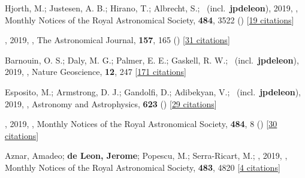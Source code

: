 \item[{\color{numcolor}\scriptsize99}] Hjorth, M.; Justesen, A. B.; Hirano, T.; Albrecht, S.; \etal\ (incl.\ \textbf{jpdeleon}), 2019, , Monthly Notices of the Royal Astronomical Society, \textbf{484}, 3522 () [\href{https://ui.adsabs.harvard.edu/abs/2019MNRAS.484.3522H}{19 citations}]

\item[{\color{numcolor}\scriptsize98}] , 2019, , The Astronomical Journal, \textbf{157}, 165 () [\href{https://ui.adsabs.harvard.edu/abs/2019AJ....157..165A}{31 citations}]

\item[{\color{numcolor}\scriptsize97}] Barnouin, O. S.; Daly, M. G.; Palmer, E. E.; Gaskell, R. W.; \etal\ (incl.\ \textbf{jpdeleon}), 2019, , Nature Geoscience, \textbf{12}, 247 [\href{https://ui.adsabs.harvard.edu/abs/2019NatGe..12..247B}{171 citations}]

\item[{\color{numcolor}\scriptsize96}] Esposito, M.; Armstrong, D. J.; Gandolfi, D.; Adibekyan, V.; \etal\ (incl.\ \textbf{jpdeleon}), 2019, , Astronomy and Astrophysics, \textbf{623} () [\href{https://ui.adsabs.harvard.edu/abs/2019A&A...623A.165E}{29 citations}]

\item[{\color{numcolor}\scriptsize95}] , 2019, , Monthly Notices of the Royal Astronomical Society, \textbf{484}, 8 () [\href{https://ui.adsabs.harvard.edu/abs/2019MNRAS.484....8L}{30 citations}]

\item[{\color{numcolor}\scriptsize94}] Aznar, Amadeo; \textbf{de Leon, Jerome}; Popescu, M.; Serra-Ricart, M.; \etal, 2019, , Monthly Notices of the Royal Astronomical Society, \textbf{483}, 4820 [\href{https://ui.adsabs.harvard.edu/abs/2019MNRAS.483.4820A}{4 citations}]

